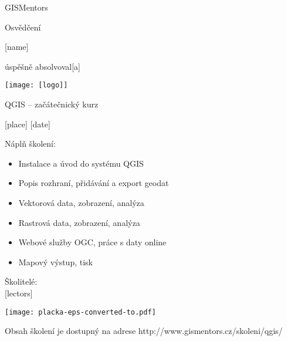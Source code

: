 \documentclass[12pt, a4paper]{letter}
\begin{document}
\pagestyle{empty}
\begin{center}

{\Large GISMentors}

{\Huge Osvědčení}

{\Large [name]}

úspěšně absolvoval[a]

\texttt{[image: [logo]]}

{\Large QGIS -- začátečnický kurz}

[place] [date]
\end{center}

Náplň školení:

\begin{itemize}
    \item Instalace a úvod do systému QGIS
    \item Popis rozhraní, přidávání a export geodat
    \item Vektorová data, zobrazení, analýza
    \item Rastrová data, zobrazení, analýza
    \item Webové služby OGC, práce s daty online
    \item Mapový výstup, tisk
\end{itemize}

\vfill
\parbox{7cm}{
        Školitelé: \\

        [lectors]
}
\hfill
\parbox{3cm}{
        \texttt{[image: placka-eps-converted-to.pdf]}
}


\begin{center}
{\footnotesize Obsah školení je dostupný na adrese
http://www.gismentors.cz/skoleni/qgis/}
\end{center}
\end{document}
